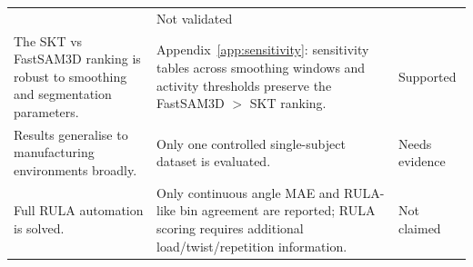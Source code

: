 \documentclass[12pt,a4paper]{article}
\begin{document}
\begin{table}[H]
\begin{tabularx}{\linewidth}{>{\raggedright\arraybackslash}p{3.8cm}>{\raggedright\arraybackslash}X>{\raggedright\arraybackslash}p{2.0cm}}
    & Not validated \\
    The SKT vs FastSAM3D ranking is robust to smoothing and segmentation parameters.
    & Appendix~\ref{app:sensitivity}: sensitivity tables across smoothing windows and activity thresholds preserve the FastSAM3D $>$ SKT ranking.
    & Supported \\
    Results generalise to manufacturing environments broadly.
    & Only one controlled single-subject dataset is evaluated.
    & Needs evidence \\
    Full RULA automation is solved.
    & Only continuous angle MAE and RULA-like bin agreement are reported; RULA scoring requires additional load/twist/repetition information.
    & Not claimed \\
    \bottomrule
  \end{tabularx}
\end{table}

\clearpage
\end{document}
